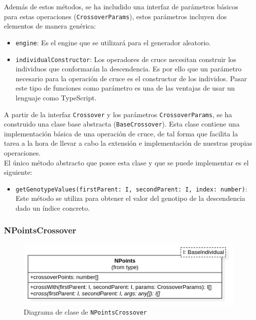 Además de estos métodos, se ha includido una interfaz de parámetros básicos para estas operaciones (\texttt{CrossoverParams}), estos parámetros incluyen dos elementos de manera genérica:

\begin{itemize}
    \item \texttt{engine}: Es el engine que se utilizará para el generador aleatorio.
    \item \texttt{individualConstructor}: Los operadores de cruce necesitan construir los individuos que conformarán la descendencia. Es por ello que un parámetro necesario para la operación de cruce es el constructor de los individos. Pasar este tipo de funciones como parámetro es una de las ventajas de usar un lenguaje como TypeScript.
\end{itemize}

A partir de la interfaz \texttt{Crossover} y los parámetros \texttt{CrossoverParams}, se ha construido una clase base abstracta (\texttt{BaseCrossover}). Esta clase contiene una implementación básica de una operación de cruce, de tal forma que facilita la tarea a la hora de llevar a cabo la extensión e implementación de nuestras propias operaciones. \\

El único método abstracto que posee esta clase y que se puede implementar es el siguiente:

\begin{itemize}
    \item \texttt{getGenotypeValues(firstParent: I, secondParent: I, index: number)}: Este método se utiliza para obtener el valor del genotipo de la descendencia dado un índice concreto.
\end{itemize}

\subsubsection{NPointsCrossover}

\begin{figure}[ht]
    \centering
    \includegraphics[scale=0.5]{mem/images/cap-4/4.2.6(Crossover)/NPoints.png}
    \caption{Diagrama de clase de \texttt{NPointsCrossover}}
    \label{fig:my_label}
\end{figure}

